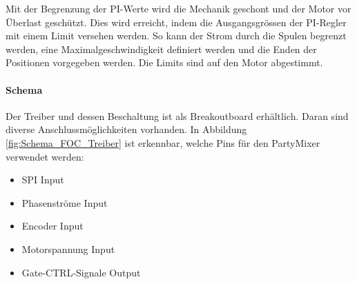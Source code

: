 


Mit der Begrenzung der PI-Werte wird die Mechanik geschont und der Motor vor Überlast geschützt. Dies wird erreicht, indem die Ausgangsgrössen der PI-Regler mit einem Limit versehen werden. So kann der Strom durch die Spulen begrenzt werden, eine Maximalgeschwindigkeit definiert werden und die Enden der Positionen vorgegeben werden. Die Limits sind auf den Motor abgestimmt. \cite{stahl_simulation_2014}

\paragraph{Schema}\label{par:Schaltungsaufbau_TMC4671}\mbox{}

Der Treiber und dessen Beschaltung ist als Breakoutboard erhältlich. Daran sind diverse Anschlussmöglichkeiten vorhanden. In Abbildung \ref{fig:Schema_FOC_Treiber} ist erkennbar, welche Pins für den PartyMixer verwendet werden:

\begin{itemize}
\item SPI Input
\item Phasenströme Input
\item Encoder Input
\item Motorspannung Input
\item Gate-CTRL-Signale Output
\end{itemize}

